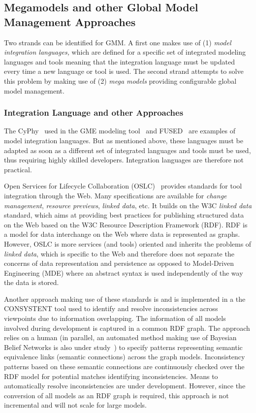 \subsection{Megamodels and other Global Model Management Approaches}%
\label{subsec:mm_and_other}%
%
Two strands can be identified for GMM. A first one makes use of
(1) \emph{model integration languages,} which are  defined for a specific set of
integrated modeling languages and tools meaning that the integration language must be updated every time a new language or tool is used. The second strand attempts to solve this problem by making use of (2) \emph{mega models} providing configurable global model management.


\subsubsection{Integration Language and other Approaches}

The CyPhy~\cite{SimkoASME2012} used in the GME modeling tool~\cite{gme-website} and FUSED~\cite{BoddyAVICPS2011,fused-website} are examples of model integration languages. But as mentioned above, these languages must be adapted as soon as a different set of integrated languages and tools must be used, thus requiring highly skilled developers. Integration languages are therefore not practical.

 Open Services for Lifecycle Collaboration (OSLC)~\cite{OSLC-website} provides standards for tool integration through the Web. Many specifications are available for \emph{change management}, \emph{resource previews}, \emph{linked data}, etc. It builds on the W3C \textit{linked data} standard, which aims at providing best practices for publishing structured data on the Web based on the W3C Resource  Description Framework (RDF). RDF is a model for data interchange on the Web where data is represented as graphs. However, OSLC is  more services (and tools) oriented and inherits the problems of \emph{linked data}, which is specific to the Web and therefore does not separate the concerns of data representation and persistence as opposed to Model-Driven Engineering (MDE) where an abstract syntax is used independently of the way the data is stored.

Another approach making use of these standards is \cite{HerzigProcCS2014} and is implemented in a the CONSYSTENT tool used to identify
and resolve inconsistencies across viewpoints due to information overlapping. The information of all
models involved during development is captured in a common RDF graph. The approach relies on a human (in parallel, an automated method making use of Bayesian Belief Networks is also under study~\cite{HerzigMoDeVVa2014}) to specify patterns representing semantic equivalence links (semantic connections) across the graph models.
Inconsistency patterns based on these semantic connections are continuously checked over the RDF model for potential matches identifying inconsistencies. Means to automatically resolve inconsistencies are under development. However, since the conversion of all models as an RDF graph is required, this approach is not incremental and will not scale for
large models.

